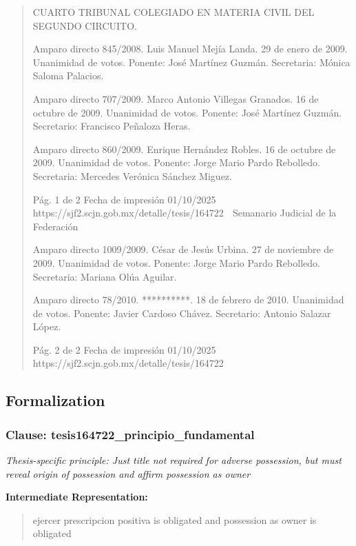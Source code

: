 \documentclass[11pt,a4paper]{article}
\begin{document}
\begin{quote}
CUARTO TRIBUNAL COLEGIADO EN MATERIA CIVIL DEL SEGUNDO CIRCUITO.


Amparo directo 845/2008. Luis Manuel Mejía Landa. 29 de enero de 2009. Unanimidad de votos.
Ponente: José Martínez Guzmán. Secretaria: Mónica Saloma Palacios.

Amparo directo 707/2009. Marco Antonio Villegas Granados. 16 de octubre de 2009. Unanimidad de
votos. Ponente: José Martínez Guzmán. Secretario: Francisco Peñaloza Heras.

Amparo directo 860/2009. Enrique Hernández Robles. 16 de octubre de 2009. Unanimidad de votos.
Ponente: Jorge Mario Pardo Rebolledo. Secretaria: Mercedes Verónica Sánchez Miguez.


                                             Pág. 1 de 2             Fecha de impresión 01/10/2025
  https://sjf2.scjn.gob.mx/detalle/tesis/164722
                                                  Semanario Judicial de la Federación

Amparo directo 1009/2009. César de Jesús Urbina. 27 de noviembre de 2009. Unanimidad de
votos. Ponente: Jorge Mario Pardo Rebolledo. Secretaria: Mariana Olúa Aguilar.

Amparo directo 78/2010. **********. 18 de febrero de 2010. Unanimidad de votos. Ponente: Javier
Cardoso Chávez. Secretario: Antonio Salazar López.




                                             Pág. 2 de 2        Fecha de impresión 01/10/2025
  https://sjf2.scjn.gob.mx/detalle/tesis/164722

\end{quote}

\subsection{Formalization}

\subsubsection{Clause: tesis164722\_principio\_fundamental}

\textit{Thesis-specific principle: Just title not required for adverse possession, but must reveal origin of possession and affirm possession as owner}

\textbf{Intermediate Representation:}

\begin{quote}
ejercer prescripcion positiva is obligated and possession as owner is obligated
\end{quote}
\end{document}
